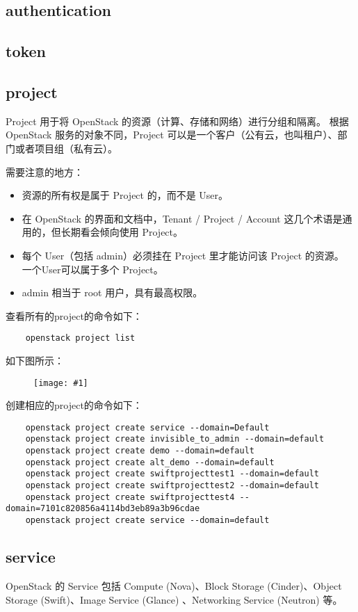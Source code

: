 \documentclass[a4paper,left=1.5cm,right=1.5cm,11pt]{article}
\newcommand{\fic}[1]{\begin{figure}[H]
		\center
		\texttt{[image: \#1]}
	\end{figure}}
\begin{document}
\subsection{authentication}

\subsection{token}

\subsection{project}
	Project 用于将 OpenStack 的资源（计算、存储和网络）进行分组和隔离。 
	根据 OpenStack 服务的对象不同，Project 可以是一个客户（公有云，也叫租户）、部门或者项目组（私有云）。\par

	需要注意的地方：
	\begin{itemize}
		\item 资源的所有权是属于 Project 的，而不是 User。
		\item 在 OpenStack 的界面和文档中，Tenant / Project / Account 这几个术语是通用的，但长期看会倾向使用 Project。
		\item 每个 User（包括 admin）必须挂在 Project 里才能访问该 Project 的资源。 一个User可以属于多个 Project。
		\item admin 相当于 root 用户，具有最高权限。
	\end{itemize}

	查看所有的project的命令如下：
	\begin{lstlisting}
	openstack project list
	\end{lstlisting}

	如下图所示：
	\fic{3.png}

	创建相应的project的命令如下：
	\begin{lstlisting}
	openstack project create service --domain=Default
	openstack project create invisible_to_admin --domain=default
	openstack project create demo --domain=default
	openstack project create alt_demo --domain=default
	openstack project create swiftprojecttest1 --domain=default
	openstack project create swiftprojecttest2 --domain=default
	openstack project create swiftprojecttest4 --domain=7101c820856a4114bd3eb89a3b96cdae
	openstack project create service --domain=default
	\end{lstlisting}

\subsection{service}
	OpenStack 的 Service 包括 Compute (Nova)、Block Storage (Cinder)、Object Storage (Swift)、Image Service (Glance) 、Networking Service (Neutron) 等。\par
\end{document}
